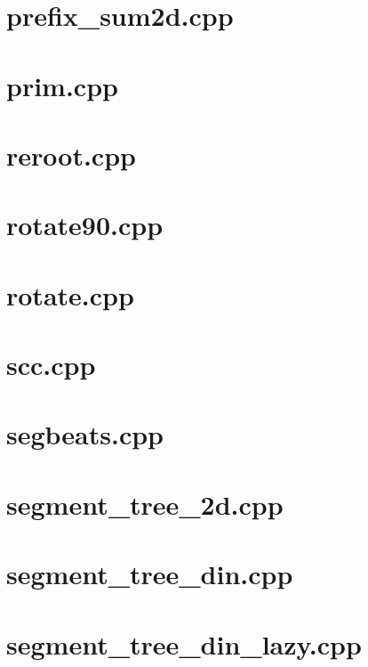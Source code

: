 \documentclass[a4paper,12pt]{article}
\begin{document}
\section{prefix_sum2d.cpp}


\section{prim.cpp}


\section{reroot.cpp}


\section{rotate90.cpp}


\section{rotate.cpp}


\section{scc.cpp}


\section{segbeats.cpp}


\section{segment_tree_2d.cpp}


\section{segment_tree_din.cpp}


\section{segment_tree_din_lazy.cpp}

\end{document}
